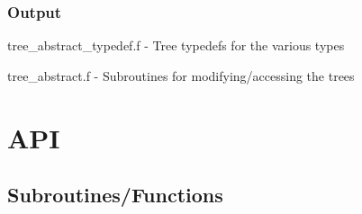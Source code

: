 \documentclass{article}
\begin{document}
\subsubsection{Output}
\begin{list}{}{}
\item tree\_abstract\_typedef.f - Tree typedefs for the various types
\item tree\_abstract.f - Subroutines for modifying/accessing the trees
\end{list}

\section{API}
\subsection{Subroutines/Functions}
\newcommand{\farg}[2]{
      \ \ \ #1 & :: #2 \\
}
\end{document}
